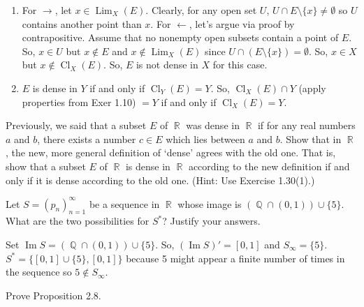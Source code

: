 \documentclass[12pt,letterpaper,boxed]{hmcpset}
\DeclareMathOperator{\Lim}{Lim}
\DeclareMathOperator{\Img}{Im}
\DeclareMathOperator{\Cl}{Cl}
\DeclareMathOperator{\R}{\mathbb{R}}
\DeclareMathOperator{\Q}{\mathbb{Q}}
\begin{document}
\begin{solution}
\vspace{-2mm}
	\begin{enumerate}
		\itemsep0em
		\item For $\rightarrow$, let $x \in \Lim_X(E).$ Clearly, for any open set $U$, $U \cap E\setminus\{x\}\neq \emptyset$ so $U$ contains another point than $x$. For $\leftarrow$, let's argue via proof by contrapositive. Assume that no nonempty open subsets contain a point of $E$. So, $x\in U$ but $x \notin E$ and $x\notin \Lim_X(E)$ since $U\cap (E\setminus \{x\})=\emptyset.$ So, $x \in X$ but $x \notin \Cl_X(E).$ So, $E$ is not dense in $X$ for this case.
		\item $E$ is dense in $Y$ if and only if $\Cl_Y(E)= Y.$ So, $\Cl_X(E)\cap Y$ (apply properties from Exer 1.10) $ = Y$ if and only if $\Cl_X(E) = Y.$ 
	\end{enumerate}
\end{solution}

\begin{problem}[Exercise 1.31]
Previously, we said that a subset $E$ of $\R$ was dense in $\R$ if for any real numbers $a$
and $b$, there exists a number $c\in E$ which lies between $a$ and $b$. Show that in $\R$, the new, more general definition of ‘dense’ agrees with the old one. That is, show that a subset $E$ of $\R$ is dense in $\R$ according
to the new definition if and only if it is dense according to the old one. (Hint: Use Exercise 1.30(1).)
\end{problem}

\begin{solution}

\end{solution}


\begin{problem}[Exercise 2.7]
Let $S = (p_n)_{n=1}^{\infty}$ be a sequence in $\R$ whose image is $(\Q\cap (0,1))\cup \{5\}.$ What are the two possibilities for $S^{*}$? Justify your answers.
\end{problem}

\begin{solution}
Set $\Img S = (\Q\cap (0,1))\cup\{5\}$. So, $(\Img S)' = [0, 1]$ and $S_{\infty}=\{ 5\}$. $S^{*}=\{[0,1]\cup \{5\}, [0,1]\}$ because 5 might appear a finite number of times in the sequence so  $5 \notin S_{\infty}.$
\end{solution}

\begin{problem}[Exercise 2.9]
Prove Proposition 2.8.
\end{problem}
\end{document}
